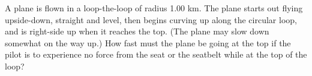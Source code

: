         A plane is flown in a loop-the-loop of radius 1.00 km.
        The plane starts out flying upside-down, straight and level,
        then begins curving up along the circular loop, and is
        right-side up when it reaches the top. (The plane may slow
        down somewhat on the way up.) How fast must the plane be
        going at the top if the pilot is to experience no force from
        the seat or the seatbelt while at the top of the loop? \answercheck
